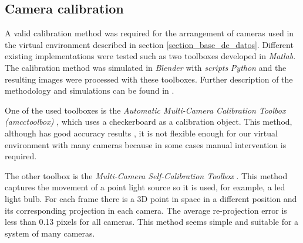 \subsection{Camera calibration}\label{calibracion}

A valid calibration method was required for the arrangement of cameras used in the virtual environment described in section \ref{section_base_de_datos}. Different existing implementations were tested such as two toolboxes developed in \emph{Matlab}. The calibration method was simulated in \emph{Blender} with \textit{scripts} \emph{Python} and the resulting images were processed with these toolboxes. Further description of the methodology and simulations can be found in \cite{proyecto_biomecanica}.

One of the used toolboxes is the \textit{Automatic Multi-Camera Calibration Toolbox (amcctoolbox)} \cite{amcctoolbox}, which uses a checkerboard as a calibration object. This method, although has good accuracy results \cite{zhang_libro}, it is not flexible enough for our virtual environment with many cameras because in some cases manual intervention is required. 

The other toolbox is the \textit{Multi-Camera Self-Calibration Toolbox} \cite{toolbox_led}. This method captures the movement of a point light source so it is used, for example, a led light bulb. For each frame there is a 3D point in space in a different position and its corresponding projection in each camera. The average re-projection error is less than 0.13 pixels for all cameras. This method seems simple and suitable for a system of many cameras.



